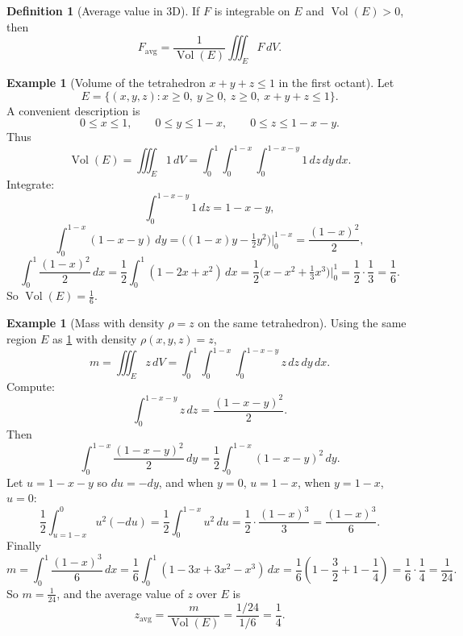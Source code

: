 \documentclass[12pt]{article}
\numberwithin{equation}{section}
\theoremstyle{plain}
\theoremstyle{definition}
\newtheorem{definition}[theorem]{Definition}
\newtheorem{example}[theorem]{Example}
\theoremstyle{remark}
\begin{document}
\begin{definition}[Average value in 3D]\label{def:avg-3d}
If $F$ is integrable on $E$ and $\operatorname{Vol}(E)>0$, then
\[
F_{\text{avg}}=\frac{1}{\operatorname{Vol}(E)}\iiint_E F\,dV.
\]
\end{definition}

\begin{example}[Volume of the tetrahedron $x+y+z\le 1$ in the first octant]\label{ex:tetra-volume}
Let
\[
E=\{(x,y,z): x\ge 0,\ y\ge 0,\ z\ge 0,\ x+y+z\le 1\}.
\]
A convenient description is
\[
0\le x\le 1,\qquad 0\le y\le 1-x,\qquad 0\le z\le 1-x-y.
\]
Thus
\[
\operatorname{Vol}(E)=\iiint_E 1\,dV
=\int_{0}^{1}\int_{0}^{1-x}\int_{0}^{1-x-y} 1\,dz\,dy\,dx.
\]
Integrate:
\[
\int_{0}^{1-x-y}1\,dz=1-x-y,
\]
\[
\int_{0}^{1-x}(1-x-y)\,dy=\Big((1-x)y-\tfrac12 y^2\Big)\Big|_{0}^{1-x}
=\frac{(1-x)^2}{2},
\]
\[
\int_{0}^{1}\frac{(1-x)^2}{2}\,dx
=\frac12\int_{0}^{1}(1-2x+x^2)\,dx
=\frac12\Big(x-x^2+\tfrac13 x^3\Big)\Big|_{0}^{1}
=\frac12\cdot\frac13=\frac{1}{6}.
\]
So $\operatorname{Vol}(E)=\frac{1}{6}$.
\end{example}

\begin{example}[Mass with density $\rho=z$ on the same tetrahedron]\label{ex:tetra-mass}
Using the same region $E$ as \cref{ex:tetra-volume} with density $\rho(x,y,z)=z$,
\[
m=\iiint_E z\,dV
=\int_{0}^{1}\int_{0}^{1-x}\int_{0}^{1-x-y} z\,dz\,dy\,dx.
\]
Compute:
\[
\int_{0}^{1-x-y} z\,dz=\frac{(1-x-y)^2}{2}.
\]
Then
\[
\int_{0}^{1-x}\frac{(1-x-y)^2}{2}\,dy
=\frac12\int_{0}^{1-x} (1-x-y)^2\,dy.
\]
Let $u=1-x-y$ so $du=-dy$, and when $y=0$, $u=1-x$, when $y=1-x$, $u=0$:
\[
\frac12\int_{u=1-x}^{0} u^2(-du)=\frac12\int_{0}^{1-x}u^2\,du=\frac12\cdot\frac{(1-x)^3}{3}=\frac{(1-x)^3}{6}.
\]
Finally
\[
m=\int_{0}^{1}\frac{(1-x)^3}{6}\,dx
=\frac{1}{6}\int_{0}^{1}(1-3x+3x^2-x^3)\,dx
=\frac{1}{6}\left(1-\frac{3}{2}+1-\frac{1}{4}\right)
=\frac{1}{6}\cdot\frac{1}{4}
=\frac{1}{24}.
\]
So $m=\frac{1}{24}$, and the average value of $z$ over $E$ is
\[
z_{\text{avg}}=\frac{m}{\operatorname{Vol}(E)}=\frac{1/24}{1/6}=\frac{1}{4}.
\]
\end{example}
\end{document}
